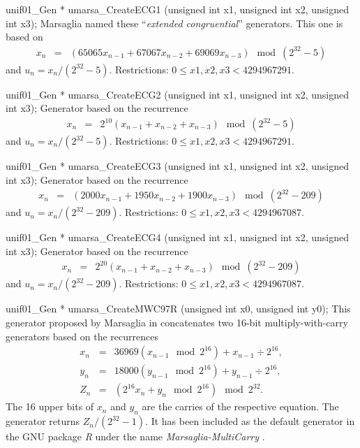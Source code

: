 unif01_Gen * umarsa_CreateECG1 (unsigned int x1, unsigned int x2,
                                unsigned int x3);
\endcode
  \tab Marsaglia \cite{rMAR96a} named these
  ``{\em extended congruential\/}'' generators. This one is based on
  \begin {eqnarray*}
   x_n &=& (65065 x_{n-1} + 67067 x_{n-2} + 69069 x_{n-3}) \mod (2^{32}-5)
  \end {eqnarray*}
  and $u_n = x_n / (2^{32}-5)$.
%
  Restrictions: $0 \le x1, x2, x3 < 4294967291$.
  \endtab
\code


unif01_Gen * umarsa_CreateECG2 (unsigned int x1, unsigned int x2,
                                unsigned int x3);
\endcode
  \tab Generator based on the recurrence
%
  \begin {eqnarray*}
   x_n &=& 2^{10} (x_{n-1} + x_{n-2} + x_{n-3}) \mod (2^{32}-5)
  \end {eqnarray*}
  and $u_n = x_n / (2^{32}-5)$.
  Restrictions: $0 \le x1, x2, x3 < 4294967291$.
  \endtab
\code


unif01_Gen * umarsa_CreateECG3 (unsigned int x1, unsigned int x2,
                                unsigned int x3);
\endcode
  \tab Generator based on the recurrence
%
  \begin {eqnarray*}
   x_n &=& (2000 x_{n-1} + 1950 x_{n-2} + 1900 x_{n-3}) \mod (2^{32}-209)
  \end {eqnarray*}
  and $u_n = x_n / (2^{32}-209)$.
  Restrictions: $0 \le x1, x2, x3 < 4294967087$.
  \endtab
\code


unif01_Gen * umarsa_CreateECG4 (unsigned int x1, unsigned int x2,
                                unsigned int x3);
\endcode
{}%
  \tab Generator based on the recurrence
  \begin{eqnarray*}
   x_n &=& 2^{20} (x_{n-1} + x_{n-2} + x_{n-3}) \mod (2^{32}-209)
  \end{eqnarray*}
  and $u_n = x_n / (2^{32}-209)$.
  Restrictions: $0 \le x1, x2, x3 < 4294967087$.
  \endtab
\code


unif01_Gen * umarsa_CreateMWC97R (unsigned int x0, unsigned int y0);
\endcode
  \tab This generator proposed by Marsaglia in \cite{rMAR97a} concatenates two
   16-bit multiply-with-carry generators based on the recurrences
  \begin{eqnarray*}
    x_{n} &=& 36969 \left(x_{n-1} \mod 2^{16}\right) + x_{n-1}\div 2^{16}, \\
    y_{n} &=& 18000 \left(y_{n-1} \mod 2^{16}\right) + y_{n-1}\div 2^{16}, \\
     Z_n &=& \left( 2^{16} x_{n}  + y_{n} \mod 2^{16}\right) \mod 2^{32}.
  \end{eqnarray*}
  The 16 upper bits of $x_n$ and  $y_n$ are the carries of the respective
  equation. The generator returns $Z_n/(2^{32} - 1)$.
  It has been included as the default generator in the GNU package {\it R}
%
  under the name {\it Marsaglia-MultiCarry} \cite{tGNU03a}.
  \endtab
\code


